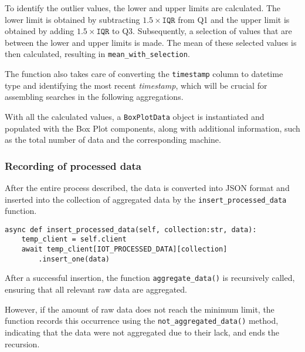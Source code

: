 To identify the outlier values, the lower and upper limits are calculated. The lower limit is obtained by subtracting \(1.5 \times \texttt{IQR}\) from Q1 and the upper limit is obtained by adding \(1.5 \times \texttt{IQR}\) to Q3. Subsequently, a selection of values that are between the lower and upper limits is made. The mean of these selected values is then calculated, resulting in \texttt{mean\_with\_selection}.

The function also takes care of converting the \texttt{timestamp} column to datetime type and identifying the most recent \textit{timestamp}, which will be crucial for assembling searches in the following aggregations.

With all the calculated values, a \texttt{BoxPlotData} object is instantiated and populated with the Box Plot components, along with additional information, such as the total number of data and the corresponding machine.


\subsubsection{Recording of processed data}
After the entire process described, the data is converted into JSON format and inserted into the collection of aggregated data by the \texttt{insert\_processed\_data} function.

\begin{Verbatim}[fontsize=\small, baselinestretch=0.8]
async def insert_processed_data(self, collection:str, data):
    temp_client = self.client
    await temp_client[IOT_PROCESSED_DATA][collection]
        .insert_one(data)
\end{Verbatim}

After a successful insertion, the function \texttt{aggregate\_data()} is recursively called, ensuring that all relevant raw data are aggregated.

However, if the amount of raw data does not reach the minimum limit, the function records this occurrence using the \texttt{not\_aggregated\_data()} method, indicating that the data were not aggregated due to their lack, and ends the recursion.